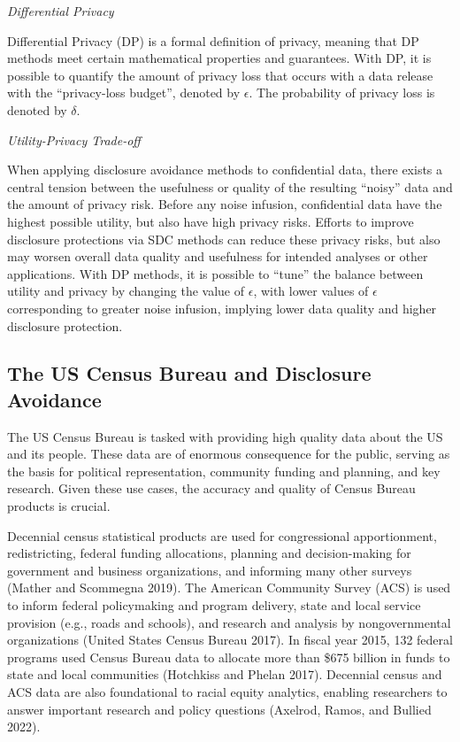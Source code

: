 \documentclass[
]{urban-formatting}
\begin{document}
\emph{Differential Privacy}

Differential Privacy (DP) is a formal definition of privacy, meaning
that DP methods meet certain mathematical properties and guarantees.
With DP, it is possible to quantify the amount of privacy loss that
occurs with a data release with the ``privacy-loss budget'', denoted by
\(\epsilon\). The probability of privacy loss is denoted by \(\delta\).

\emph{Utility-Privacy Trade-off}

When applying disclosure avoidance methods to confidential data, there
exists a central tension between the usefulness or quality of the
resulting ``noisy'' data and the amount of privacy risk. Before any
noise infusion, confidential data have the highest possible utility, but
also have high privacy risks. Efforts to improve disclosure protections
via SDC methods can reduce these privacy risks, but also may worsen
overall data quality and usefulness for intended analyses or other
applications. With DP methods, it is possible to ``tune'' the balance
between utility and privacy by changing the value of \(\epsilon\), with
lower values of \(\epsilon\) corresponding to greater noise infusion,
implying lower data quality and higher disclosure protection.

\subsection{The US Census Bureau and Disclosure Avoidance}

The US Census Bureau is tasked with providing high quality data about
the US and its people. These data are of enormous consequence for the
public, serving as the basis for political representation, community
funding and planning, and key research. Given these use cases, the
accuracy and quality of Census Bureau products is crucial.

Decennial census statistical products are used for congressional
apportionment, redistricting, federal funding allocations, planning and
decision-making for government and business organizations, and informing
many other surveys (Mather and Scommegna 2019). The American Community
Survey (ACS) is used to inform federal policymaking and program
delivery, state and local service provision (e.g., roads and schools),
and research and analysis by nongovernmental organizations (United
States Census Bureau 2017). In fiscal year 2015, 132 federal programs
used Census Bureau data to allocate more than \$675 billion in funds to
state and local communities (Hotchkiss and Phelan 2017). Decennial
census and ACS data are also foundational to racial equity analytics,
enabling researchers to answer important research and policy questions
(Axelrod, Ramos, and Bullied 2022).
\end{document}
